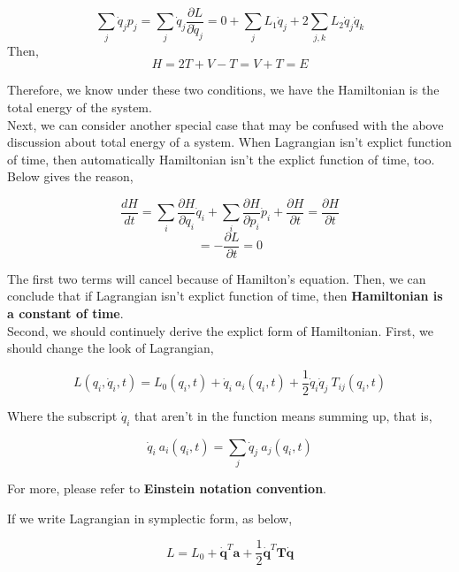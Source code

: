 \documentclass[12pt]{article}
\begin{document}
\begin{center}
    \[ \sum_{j}{\dot{q}_jp_j} = \sum_{j}{\dot{q}_j \frac{\partial L}{\partial \dot{q}_j}} = 0 + \sum_{j}{L_1\dot{q}_j} + 2 \sum_{j, k}{L_2 \dot{q}_j\dot{q}_k} \]
    Then,
    \[ H = 2T + V - T = V + T = E \]
\end{center}

Therefore, we know under these two conditions, we have the Hamiltonian is the total energy of the system.
\\
\indent Next, we can consider another special case that may be confused with the above discussion about total energy of a system. When Lagrangian isn't explict function of time, then automatically Hamiltonian isn't the explict function of time, too. Below gives the reason,

\begin{center}
    \[ \frac{dH}{dt} = \sum_{i}{\frac{\partial H}{\partial q_i}\dot{q}_i} + \sum_{i}{\frac{\partial H}{\partial p_i}\dot{p}_i} + \frac{\partial H}{\partial t} = \frac{\partial H}{\partial t} \]
    \[ = -\frac{\partial L}{\partial t} = 0 \]
\end{center}

The first two terms will cancel because of Hamilton's equation.
Then, we can conclude that if Lagrangian isn't explict function of time, then \textbf{Hamiltonian is a constant of time}.
\\
\indent Second, we should continuely derive the explict form of Hamiltonian. First, we should change the look of Lagrangian,

\begin{center}
    \[ L(q_i, \dot{q}_i, t) = L_0(q_i,t) + \dot{q}_i\ a_i(q_i, t) + \frac{1}{2}\dot{q}_i\dot{q}_j\ T_{ij}(q_i, t) \]
\end{center}

Where the subscript $\dot{q}_i$ that aren't in the function means summing up, that is,

\begin{center}
    \[ \dot{q}_i\ a_i(q_i, t) = \sum_{j}{\dot{q}_j\ a_j(q_i, t)} \]
\end{center}

For more, please refer to \textbf{Einstein notation convention}.

If we write Lagrangian in symplectic form, as below,

\begin{center}
    \[ L = L_0 + \mathbf{\dot{q}}^T \mathbf{a} + \frac{1}{2}\mathbf{\dot{q}}^T \mathbf{T} \mathbf{\dot{q}} \]
\end{center}
\end{document}
